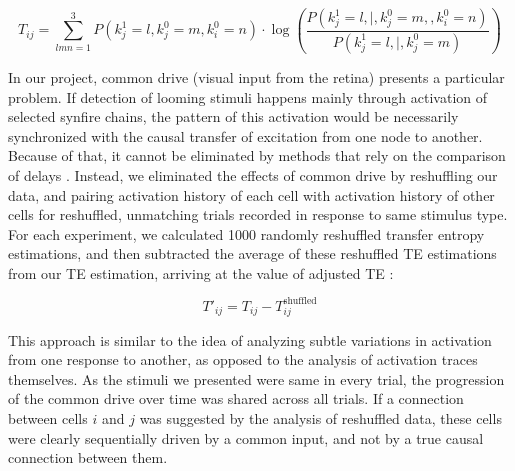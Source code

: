 \documentclass{article}
\begin{document}
\[ T_{ij} = \sum_{lmn=1}^3{P(k_j^1=l,k_j^0=m,k_i^0=n)}\cdot \log\left(\frac{P(k_j^1=l , \mid , k_j^0=m, , k_i^0=n)}{P(k_j^1=l , \mid , k_j^0=m)}\right) \]

In our project, common drive (visual input from the retina) presents a particular problem. If detection of looming stimuli happens mainly through activation of selected synfire chains, the pattern of this activation would be necessarily synchronized with the causal transfer of excitation from one node to another. Because of that, it cannot be eliminated by methods that rely on the comparison of delays \citep{wollstadt2014te}. Instead, we eliminated the effects of common drive by reshuffling our data, and pairing activation history of each cell with activation history of other cells for reshuffled, unmatching trials recorded in response to same stimulus type. For each experiment, we calculated 1000 randomly reshuffled transfer entropy estimations, and then subtracted the average of these reshuffled TE estimations from our TE estimation, arriving at the value of adjusted TE \citep{gourevitch2007te}:

\[ T'_{ij} = T_{ij} - T^\text{shuffled}_{ij} \]

This approach is similar to the idea of analyzing subtle variations in activation from one response to another, as opposed to the analysis of activation traces themselves. As the stimuli we presented were same in every trial, the progression of the common drive over time was shared across all trials. If a connection between cells $i$ and $j$ was suggested by the analysis of reshuffled data, these cells were clearly sequentially driven by a common input, and not by a true causal connection between them.
\end{document}
